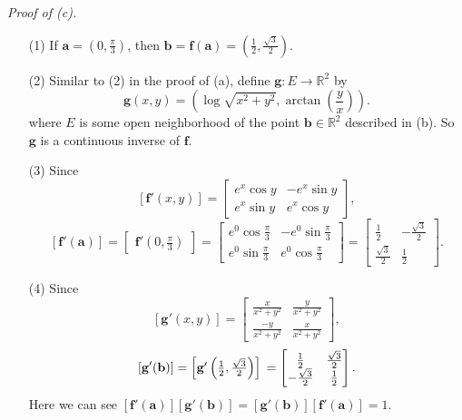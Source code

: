\documentclass{article}
\begin{document}
\emph{Proof of (c).}
\begin{enumerate}
\item[(1)]
  If $\mathbf{a} = \left(0, \frac{\pi}{3}\right)$, then
  $\mathbf{b} = \mathbf{f}(\mathbf{a}) = \left( \frac{1}{2}, \frac{\sqrt{3}}{2} \right)$.

\item[(2)]
  Similar to (2) in the proof of (a),
  define $\mathbf{g}: E \to \mathbb{R}^2$ by
  \[
    \mathbf{g}(x,y) = \left(\log \sqrt{x^2+y^2}, \arctan\left(\frac{y}{x}\right) \right).
  \]
  where $E$ is some open neighborhood of the point $\mathbf{b} \in \mathbb{R}^2$ described in (b).
  So $\mathbf{g}$ is a continuous inverse of $\mathbf{f}$.

\item[(3)]
  Since
  \[
    [\mathbf{f}'(x,y)]
    =
    \begin{bmatrix}
      e^x \cos y & -e^x \sin y \\
      e^x \sin y &  e^x \cos y
    \end{bmatrix},
  \]
  \[
    [\mathbf{f}'(\mathbf{a})]
    =
    \begin{bmatrix}
      \mathbf{f}'\left(0, \frac{\pi}{3}\right)
    \end{bmatrix}
    =
    \begin{bmatrix}
      e^0 \cos \frac{\pi}{3} & -e^0 \sin \frac{\pi}{3} \\
      e^0 \sin \frac{\pi}{3} &  e^0 \cos \frac{\pi}{3}
    \end{bmatrix}
    =
    \begin{bmatrix}
      \frac{1}{2} & -\frac{\sqrt{3}}{2} \\
      \frac{\sqrt{3}}{2} & \frac{1}{2}
    \end{bmatrix}.
  \]

\item[(4)]
  Since
  \[
    [\mathbf{g}'(x,y)]
    =
    \begin{bmatrix}
      \frac{x}{x^2+y^2} & \frac{y}{x^2+y^2} \\
      \frac{-y}{x^2+y^2} & \frac{x}{x^2+y^2}
    \end{bmatrix},
  \]
  \[
    [\mathbf{g}'(\mathbf{b})]
    =
    \begin{bmatrix}
      \mathbf{g}'\left( \frac{1}{2}, \frac{\sqrt{3}}{2} \right)
    \end{bmatrix} \\
    =
    \begin{bmatrix}
      \frac{1}{2} & \frac{\sqrt{3}}{2} \\
      -\frac{\sqrt{3}}{2} & \frac{1}{2}
    \end{bmatrix}.
  \]
  Here we can see $[\mathbf{f}'(\mathbf{a})][\mathbf{g}'(\mathbf{b})]
  = [\mathbf{g}'(\mathbf{b})][\mathbf{f}'(\mathbf{a})] = 1$.


\end{enumerate}
\end{document}
